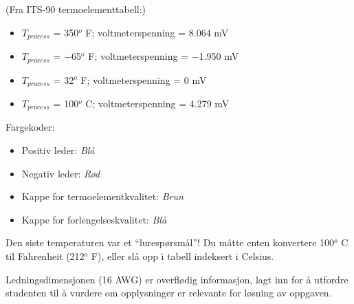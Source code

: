 





(Fra ITS-90 termoelementtabell:)

\begin{itemize}
\item{} $T_{process}$ = 350$^{o}$ F; voltmeterspenning = 8.064 mV
\item{} $T_{process}$ = $-$65$^{o}$ F; voltmeterspenning = $-$1.950 mV
\item{} $T_{process}$ = 32$^{o}$ F; voltmeterspenning = 0 mV
\item{} $T_{process}$ = 100$^{o}$ C; voltmeterspenning = 4.279 mV
\end{itemize}

\vskip 10pt


Fargekoder:

\begin{itemize}
\item{} Positiv leder: {\it Blå}
\item{} Negativ leder: {\it Rød}
\item{} Kappe for termoelementkvalitet: {\it Brun}
\item{} Kappe for forlengelseskvalitet: {\it Blå}
\end{itemize}

Den siste temperaturen var et ``lurespørsmål''! Du måtte enten konvertere 100$^{o}$ C til Fahrenheit (212$^{o}$ F), eller slå opp i tabell indeksert i Celsius.

\vskip 10pt

Ledningsdimensjonen (16 AWG) er overflødig informasjon, lagt inn for å utfordre studenten til å vurdere om opplysninger er relevante for løsning av oppgaven.









